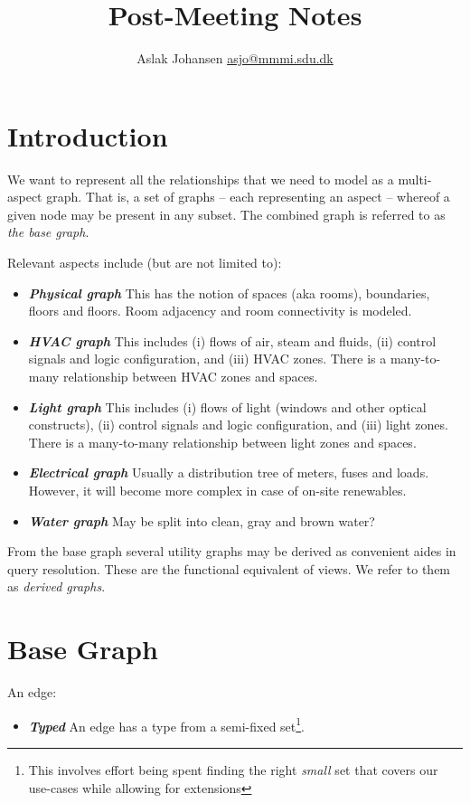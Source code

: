 \documentclass{article}
\title{Post-Meeting Notes\\\scalebox{.85}{from 23rd Mar, 2016}}
\author{Aslak Johansen \href{mailto:asjo@mmmi.sdu.dk}{asjo@mmmi.sdu.dk}}
\newcommand{\textdesc}[1]{\textit{\textbf{#1}}}
\newcommand{\descitem}[1]{\item \textdesc{#1}}
\begin{document}
\maketitle
\tableofcontents
\newpage

\section{Introduction}

We want to represent all the relationships that we need to model as a multi-aspect graph. That is, a set of graphs -- each representing an aspect -- whereof a given node may be present in any subset. The combined graph is referred to as \textsl{the base graph}.

Relevant aspects include (but are not limited to):
\begin{itemize}
  \descitem{Physical graph} This has the notion of spaces (aka rooms), boundaries, floors and floors. Room adjacency and room connectivity is modeled.
  \descitem{HVAC graph} This includes (i) flows of air, steam and fluids, (ii) control signals and logic configuration, and (iii) HVAC zones. There is a many-to-many relationship between HVAC zones and spaces.
  \descitem{Light graph} This includes (i) flows of light (windows and other optical constructs), (ii) control signals and logic configuration, and (iii) light zones. There is a many-to-many relationship between light zones and spaces.
  \descitem{Electrical graph} Usually a distribution tree of meters, fuses and loads. However, it will become more complex in case of on-site renewables.
  \descitem{Water graph} May be split into clean, gray and brown water?
\end{itemize}

From the base graph several utility graphs may be derived as convenient aides in query resolution. These are the functional equivalent of views. We refer to them as \textsl{derived graphs}.

\section{Base Graph}

An edge:
\begin{itemize}
  \descitem{Typed} An edge has a type from a semi-fixed set\footnote{This involves effort being spent finding the right \textsl{small} set that covers our use-cases while allowing for extensions}.
\end{itemize}
\end{document}
